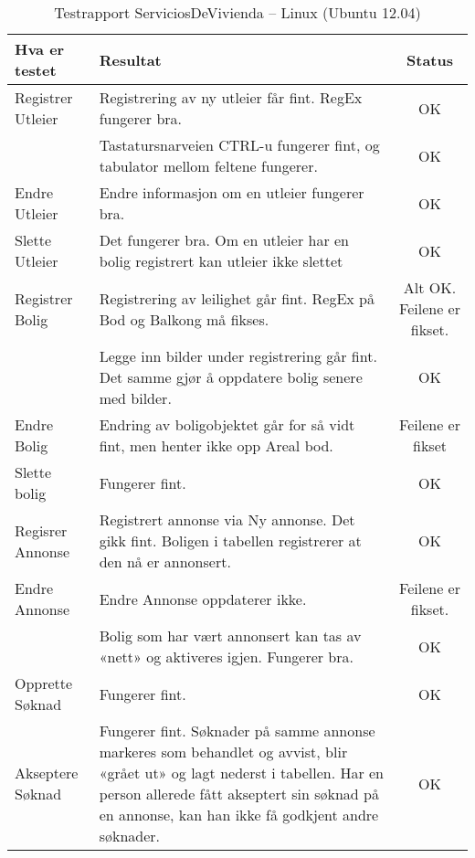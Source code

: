 \begin{table}

\caption[Testrapport – Linux (Ubuntu 12.04)]{Testrapport ServiciosDeVivienda – Linux (Ubuntu 12.04)}
\label{tab:test1}

\begin{tabular}{|l|p{7cm}|c|}
\hline
\textbf{\large Hva er testet}
&
\textbf{\large Resultat}
&
\textbf{\large Status}
\\ \hline
Registrer Utleier
&
Registrering av ny utleier får fint. RegEx fungerer bra.
&
OK
\\ \hline

&
Tastatursnarveien CTRL-u fungerer fint, og tabulator mellom feltene fungerer.
&
OK
\\ \hline
Endre Utleier
&
Endre informasjon om en utleier fungerer bra.
&
OK
\\ \hline
Slette Utleier
&
Det fungerer bra. Om en utleier har en bolig registrert kan utleier ikke slettet
&
OK
\\ \hline
Registrer Bolig
&
Registrering av leilighet går fint. RegEx på Bod og Balkong må fikses.
&
Alt OK.
Feilene er fikset.
\\ \hline

&
Legge inn bilder under registrering går fint. Det samme gjør å oppdatere bolig senere med bilder.
&
OK
\\ \hline
Endre Bolig
&
Endring av boligobjektet går for så vidt fint, men henter ikke opp Areal bod.
&
Feilene er fikset
\\ \hline
Slette bolig
&
Fungerer fint.
&
OK
\\ \hline
Regisrer Annonse
&
Registrert annonse via Ny annonse. Det gikk fint.
Boligen i tabellen registrerer at den nå er annonsert.
&
OK
\\ \hline
Endre Annonse
&
Endre Annonse oppdaterer ikke.
&
Feilene er fikset.
\\ \hline

&
Bolig som har vært annonsert kan tas av «nett» og aktiveres igjen. Fungerer bra.
&
OK
\\ \hline
Opprette Søknad
&
Fungerer fint.
&
OK
\\ \hline
Akseptere Søknad
&
Fungerer fint. Søknader på samme annonse markeres som behandlet og avvist, blir «grået ut» og lagt nederst i tabellen.
Har en person allerede fått akseptert sin søknad på en annonse, kan han ikke få godkjent andre søknader.
&
OK
\\ \hline

\end{tabular}

\end{table}




